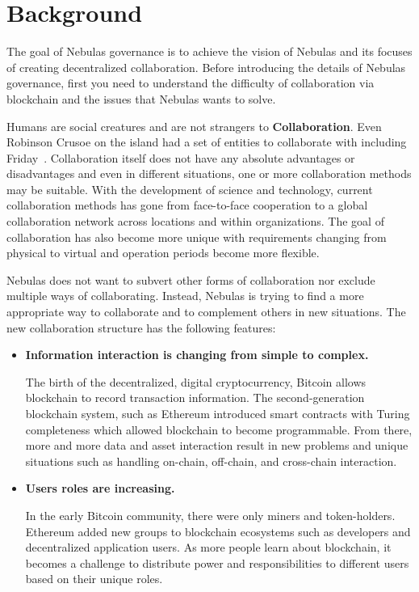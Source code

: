 \section{Background}

The goal of Nebulas governance is to achieve the vision of Nebulas and its focuses of creating decentralized collaboration. Before introducing the details of Nebulas governance, first you need to understand the difficulty of collaboration via blockchain and the issues that Nebulas wants to solve.

\label{background}

Humans are social creatures and are not strangers to \textbf{Collaboration}. Even Robinson Crusoe on the island had a set of entities to collaborate with including Friday~\cite{robinson}. Collaboration itself does not have any absolute advantages or disadvantages and even in different situations, one or more collaboration methods may be suitable. With the development of science and technology, current collaboration methods has gone from face-to-face cooperation to a global collaboration network across locations and within organizations. The goal of collaboration has also become more unique with requirements changing from physical to virtual and operation periods become more flexible.

Nebulas does not want to subvert other forms of collaboration nor exclude multiple ways of collaborating. Instead, Nebulas is trying to find a more appropriate way to collaborate and to complement others in new situations. The new collaboration structure has the following features:

\begin{itemize}
	\item \textbf{Information interaction is changing from simple to complex.}

	The birth of the decentralized, digital cryptocurrency, Bitcoin allows blockchain to record transaction information. The second-generation blockchain system, such as Ethereum introduced smart contracts with Turing completeness which allowed blockchain to become programmable. From there, more and more data and asset interaction result in new problems and unique situations such as handling on-chain, off-chain, and cross-chain interaction.

	\item \textbf{Users roles are increasing.}

	In the early Bitcoin community, there were only miners and token-holders. Ethereum added new groups to blockchain ecosystems such as developers and decentralized application users. As more people learn about blockchain, it becomes a challenge to distribute power and responsibilities to different users based on their unique roles.

\end{itemize}

